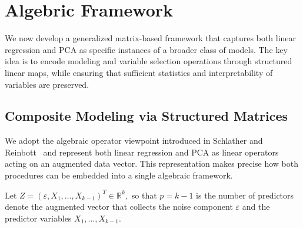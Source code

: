\section{Algebric Framework}


We now develop a generalized matrix-based framework that captures both linear regression and PCA as specific instances of a broader class of models. The key idea is to encode modeling and variable selection operations through structured linear maps, while ensuring that sufficient statistics and interpretability of variables are preserved.

\subsection{Composite Modeling via Structured Matrices}
\label{subsec:operator-formulation} 

We adopt the algebraic operator viewpoint introduced in Schlather and Reinbott~\cite{reinbott2021} and represent both linear regression and PCA as linear operators acting on an augmented data vector. This representation makes precise how both procedures can be embedded into a single algebraic framework.

\begin{defn} Let $Z = ( \varepsilon, X_1, \dots, X_{k-1} )^T \in \mathbb{R}^k,$ so that $p=k-1$ is the number of predictors denote the augmented vector that collects the noise component \(\varepsilon\) and the predictor variables \(X_1,\dots,X_{k-1}\).
\end{defn}

